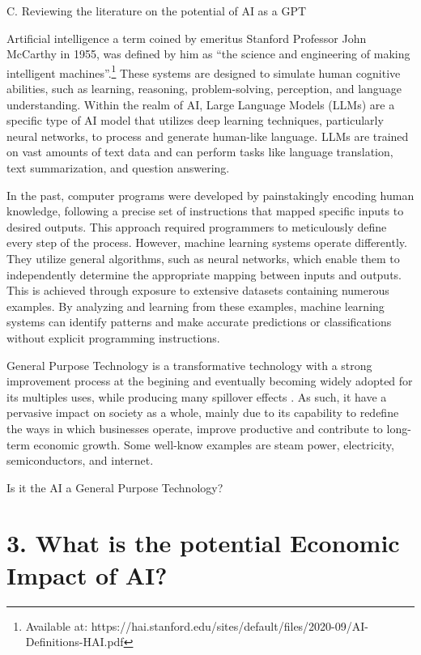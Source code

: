 \documentclass[preprint, 3p,
authoryear]{elsarticle} %
\begin{document}
C. Reviewing the literature on the potential of AI as a GPT

Artificial intelligence a term coined by emeritus Stanford Professor
John McCarthy in 1955, was defined by him as ``the science and
engineering of making intelligent machines''.\footnote{Available at:
  https://hai.stanford.edu/sites/default/files/2020-09/AI-Definitions-HAI.pdf}
These systems are designed to simulate human cognitive abilities, such
as learning, reasoning, problem-solving, perception, and language
understanding. Within the realm of AI, Large Language Models (LLMs) are
a specific type of AI model that utilizes deep learning techniques,
particularly neural networks, to process and generate human-like
language. LLMs are trained on vast amounts of text data and can perform
tasks like language translation, text summarization, and question
answering.

In the past, computer programs were developed by painstakingly encoding
human knowledge, following a precise set of instructions that mapped
specific inputs to desired outputs. This approach required programmers
to meticulously define every step of the process. However, machine
learning systems operate differently. They utilize general algorithms,
such as neural networks, which enable them to independently determine
the appropriate mapping between inputs and outputs. This is achieved
through exposure to extensive datasets containing numerous examples. By
analyzing and learning from these examples, machine learning systems can
identify patterns and make accurate predictions or classifications
without explicit programming instructions.

General Purpose Technology is a transformative technology with a strong
improvement process at the begining and eventually becoming widely
adopted for its multiples uses, while producing many spillover effects
\citep{paradox}. As such, it have a pervasive impact on society as a
whole, mainly due to its capability to redefine the ways in which
businesses operate, improve productive and contribute to long-term
economic growth. Some well-know examples are steam power, electricity,
semiconductors, and internet.

Is it the AI a General Purpose Technology?

\hypertarget{what-is-the-potential-economic-impact-of-ai}{%
\section{3. What is the potential Economic Impact of
AI?}\label{what-is-the-potential-economic-impact-of-ai}}
\end{document}
